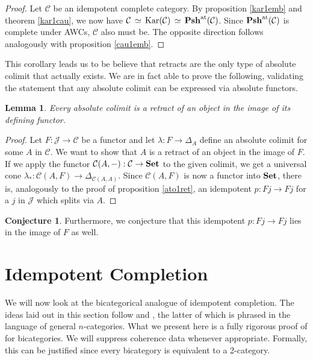 \documentclass[12pt,oneside,reqno,a4paper]{article}
\newtheorem{lemma}[theorem]{Lemma}
\theoremstyle{definition}
\newtheorem{conjecture}[theorem]{Conjecture}
\newcommand{\Set}{\textbf{\textup{Set}}}
\newcommand{\Pshat}[1]{\textbf{\textup{Psh}}^\textup{at}(#1)}
\newcommand{\Kar}[1]{\textup{Kar}(#1)}
\renewcommand{\equiv}{\,\simeq\,}
\newcommand{\C}{\mathcal{C}}
\newcommand{\J}{\mathcal{J}}
\begin{document}
\begin{proof}
Let $\C$ be an idempotent complete category. By proposition \ref{kar1emb} and theorem \ref{kar1cau}, we now have $\C\equiv\Kar{\C}\equiv \Pshat{\C}$. Since $\Pshat{\C}$ is complete under AWCs, $\C$ also must be. The opposite direction follows analogously with proposition \ref{cau1emb}.
\end{proof}

This corollary leads us to be believe that retracts are the only type of absolute colimit that actually exists. We are in fact able to prove the following, validating the statement that any absolute colimit can be expressed via absolute functors.

\begin{lemma} \label{abssplit}
Every absolute colimit is a retract of an object in the image of its defining functor.
\end{lemma}

\begin{proof}
Let $F:\J\to\C$ be a functor and let $\lambda:F\to \Delta_A$ define an absolute colimit for some $A$ in $\C$. We want to show that $A$ is a retract of an object in the image of $F$. If we apply the functor $\C(A,-):\C\to\Set$ to the given colimit, we get a universal cone $\lambda_*:\C(A,F)\to \Delta_{\C(A,A)}$. Since $\C(A,F)$ is now a functor into $\Set$, there is, analogously to the proof of proposition \ref{ato1ret}, an idempotent $p:Fj\to Fj$ for a $j$ in $\J$ which splits via $A$.
\end{proof}

\begin{conjecture}
Furthermore, we conjecture that this idempotent $p:Fj\to Fj$ lies in the image of $F$ as well. 
\end{conjecture}

\section{Idempotent Completion} \label{sec4}

We will now look at the bicategorical analogue of idempotent completion. The ideas laid out in this section follow \cite{DR} and \cite{GJF}, the latter of which is phrased in the language of general $n$-categories. What we present here is a fully rigorous proof of \cite[Theorem 2.3.11.]{GJF} for bicategories. We will suppress coherence data whenever appropriate. Formally, this can be justified since every bicategory is equivalent to a 2-category.
\end{document}
